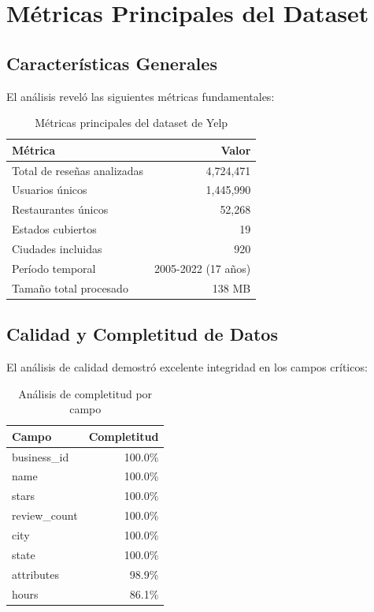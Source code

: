 \documentclass[12pt,a4paper,twoside,openany]{book}
\begin{document}
\section{Métricas Principales del Dataset}

\subsection{Características Generales}

El análisis reveló las siguientes métricas fundamentales:

\begin{table}[H]
\centering
\caption{Métricas principales del dataset de Yelp}
\begin{tabular}{@{}lr@{}}
\toprule
\textbf{Métrica} & \textbf{Valor} \\
\midrule
Total de reseñas analizadas & 4,724,471 \\
Usuarios únicos & 1,445,990 \\
Restaurantes únicos & 52,268 \\
Estados cubiertos & 19 \\
Ciudades incluidas & 920 \\
Período temporal & 2005-2022 (17 años) \\
Tamaño total procesado & 138 MB \\
\bottomrule
\end{tabular}
\end{table}

\subsection{Calidad y Completitud de Datos}

El análisis de calidad demostró excelente integridad en los campos críticos:

\begin{table}[H]
\centering
\caption{Análisis de completitud por campo}
\begin{tabular}{@{}lr@{}}
\toprule
\textbf{Campo} & \textbf{Completitud} \\
\midrule
business\_id & 100.0\% \\
name & 100.0\% \\
stars & 100.0\% \\
review\_count & 100.0\% \\
city & 100.0\% \\
state & 100.0\% \\
attributes & 98.9\% \\
hours & 86.1\% \\
\bottomrule
\end{tabular}
\end{table}
\end{document}

